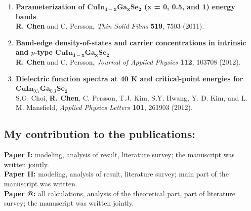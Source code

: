 \documentclass[a4paper, 12pt, titlepage,oneside,drop]{kthesis}
\makeatletter
\newcommand{\Rmnum}[1]{\expandafter\@slowromancap\romannumeral #1@}
\makeatother
\begin{document}
\begin{enumerate}
\renewcommand{\labelenumi}{\Roman{enumi}}
\item{}  \textbf{Parameterization of $\mathbf {CuIn_{1-x}Ga_{x}Se_2}$ (x = 0, 0.5, and 1) energy bands}
\\\textbf{R. Chen} and C. Persson, \textit{Thin Solid Films} {\textbf {519}}, 7503 (2011).



\item{}\textbf{Band-edge density-of-states and carrier concentrations in intrinsic and $p$-type $\mathbf {CuIn_{1-x}Ga_{x}Se_2}$}
\\\textbf{R. Chen} and C. Persson, \textit{Journal of Applied Physics} {\textbf {112}}, 103708 (2012).

\item{} \textbf{Dielectric function spectra at 40 K and critical-point energies for $\mathbf {CuIn_{0.7}Ga_{0.3}Se_2}$}
\\ S.G. Choi, \textbf{R. Chen}, C. Persson, T.J. Kim, S.Y. Hwang, Y. D. Kim, and L. M. Mansfield,
\textit{Applied Physics Letters} {\textbf {101}}, 261903 (2012).

\end{enumerate}
\subsection*{My contribution to the publications:}

\textbf{Paper I:} modeling, analysis of result, literature survey;
the manuscript was written jointly.\\
\textbf{Paper II:} modeling, analysis of result, literature survey; main part of the manuscript was written.\\
\textbf{Paper \Rmnum{3}:} all calculations, analysis of the theoretical part, part of literature survey;
the manuscript was written jointly.\\
\end{document}
